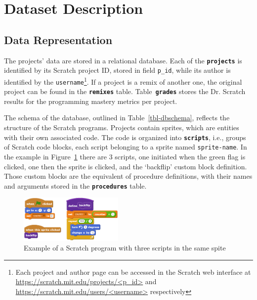 \documentclass[10pt, conference]{IEEEtran}
\begin{document}
\section{Dataset Description}

\subsection{Data Representation}

The projects' data are stored in a relational database. Each of the \textbf{\texttt{projects}} is identified by its Scratch project ID, stored in field \texttt{p\_id}, while its author is identified by the \texttt{username}\footnote{\label{fn-authorpage}Each project and author page can be accessed in the Scratch web interface at \url{https://scratch.mit.edu/projects/<p_id>} and \url{https://scratch.mit.edu/users/<username>} respectively}.
If a project is a remix of another one, the original project can be found in the \textbf{\texttt{remixes}} table.
Table~\textbf{\texttt{grades}} stores the Dr. Scratch results for the programming mastery metrics per project.

The schema of the database, outlined in Table~\ref{tbl-dbschema}, reflects the structure of the Scratch programs.
Projects contain sprites, which are entities with their own associated code.
The code is organized into \textbf{\texttt{scripts}}, i.e., groups of Scratch code blocks, each script belonging to a sprite named \texttt{sprite-name}.
In the example in Figure~\ref{fig-scratchExample} there are 3 scripts, one initiated when the green flag is clicked, one then the sprite is clicked, and the `backflip' custom block definition.
Those custom blocks are the equivalent of procedure definitions, with their names and arguments stored in the \textbf{\texttt{procedures}} table.

 \begin{figure}
 	\centering
 	\includegraphics[width=0.45\textwidth]{scratchExample}
 	\caption{Example of a Scratch program with three scripts in the same spite}
 	\label{fig-scratchExample}
 \end{figure}
 
\end{document}
